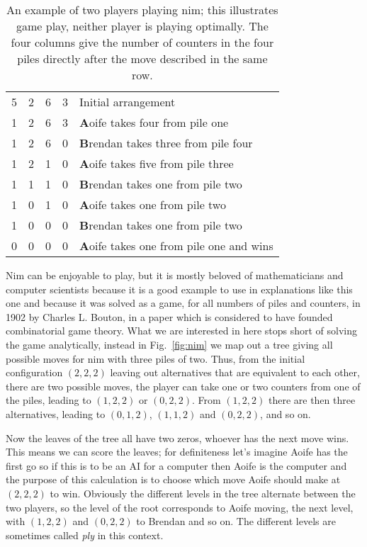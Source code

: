 \documentclass[11pt,a4paper]{scrartcl}
\begin{document}
\begin{table}
\begin{tabular}{cccc|l}
5&2&6&3&Initial arrangement\\
1&2&6&3&\textbf{A}oife takes four from pile one\\
1&2&6&0&\textbf{B}rendan takes three from pile four\\
1&2&1&0&\textbf{A}oife takes five from pile three\\
1&1&1&0&\textbf{B}rendan takes one from pile two\\
1&0&1&0&\textbf{A}oife takes one from pile two\\
1&0&0&0&\textbf{B}rendan takes one from pile two\\
0&0&0&0&\textbf{A}oife takes one from pile one and wins
\end{tabular}
\caption{An example of two players playing nim; this illustrates game play, neither player is playing optimally. The four columns give the number of counters in the four piles directly after the move described in the same row.\label{tab:nim_example}}
\end{table}

Nim can be enjoyable to play, but it is mostly beloved of
mathematicians and computer scientists because it is a good example to
use in explanations like this one and because it was solved as a game,
for all numbers of piles and counters, in 1902 by Charles L. Bouton,
in a paper which is considered to have founded combinatorial game
theory. What we are interested in here stops short of solving the game
analytically, instead in Fig.~\ref{fig:nim} we map out a tree giving
all possible moves for nim with three piles of two. Thus, from the
initial configuration $(2,2,2)$ leaving out alternatives that are
equivalent to each other, there are two possible moves, the player can
take one or two counters from one of the piles, leading to $(1,2,2)$
or $(0,2,2)$. From $(1,2,2)$ there are then three alternatives,
leading to $(0,1,2)$, $(1,1,2)$ and $(0,2,2)$, and so on.

Now the leaves of the tree all have two zeros, whoever has the next
move wins. This means we can score the leaves; for definiteness let's
imagine Aoife has the first go so if this is to be an AI for a
computer then Aoife is the computer and the purpose of this
calculation is to choose which move Aoife should make at $(2,2,2)$ to
win. Obviously the different levels in the tree alternate between the
two players, so the level of the root corresponds to Aoife moving, the
next level, with $(1,2,2)$ and $(0,2,2)$ to Brendan and so on. The
different levels are sometimes called \textsl{ply} in this context.
\end{document}
